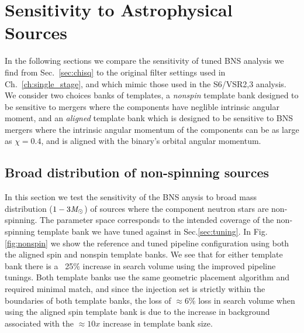 \section{Sensitivity to Astrophysical Sources}

In the following sections we compare the sensitivity of tuned BNS analysis we find from Sec.~\ref{sec:chisq} to the original filter settings used in Ch.~\ref{ch:single_stage}, and which mimic those used in the S6/VSR2,3 analysis. We consider two choices banks of templates, a \emph{nonspin} template bank designed to be sensitive to mergers where the components have neglible intrinsic angular moment, and an \emph{aligned} template bank which is designed to be sensitive to BNS mergers where the intrinsic angular momentum of the components can be as large as $\chi=0.4$, and is aligned with the binary's orbital angular momentum.

\subsection{Broad distribution of non-spinning sources}

In this section we test the sensitivity of the BNS anysis to broad mass distribution ($1-3 \mathit{M}_\odot$) of sources where the component neutron stars are non-spinning. The parameter space corresponds to the intended coverage of the non-spinning template bank we have tuned against in Sec.\ref{sec:tuning}.  In Fig.\ref{fig:nonspin} we show the reference and tuned pipeline configuration using both the aligned spin and nonspin template banks. We see that for either template bank there is a ~25$\%$ increase in search volume using the improved pipeline tunings. Both template banks use the same geometric placement algorithm and required minimal match, and since the injection set is strictly within the boundaries of both template banks, the loss of $\approx 6\%$ loss in search volume when using the aligned spin template bank is due to the increase in background associated with the $\approx 10x$ increase in template bank size.

